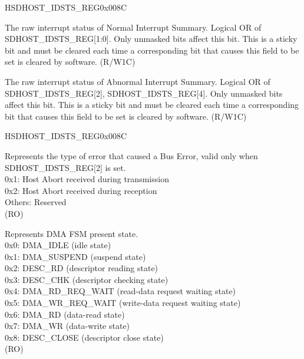 \begin{register}{H}{SDHOST\_IDSTS\_REG}{0x008C}
\begin{regdesc}
\begin{reglist}
\label{fielddesc:SDHOSTIDSTSNIS}\item [SDHOST\_IDSTS\_NIS] The raw interrupt status of Normal Interrupt Summary. Logical OR of SDHOST\_IDSTS\_REG[1:0]. Only unmasked bits affect this bit. This is a sticky bit and must be cleared each time a corresponding bit that causes this field to be set is cleared by software. (R/W1C)
\label{fielddesc:SDHOSTIDSTSAIS}\item [SDHOST\_IDSTS\_AIS] The raw interrupt status of Abnormal Interrupt Summary. Logical OR of SDHOST\_IDSTS\_REG[2], SDHOST\_IDSTS\_REG[4]. Only unmasked bits affect this bit. This is a sticky bit and must be cleared each time a corresponding bit that causes this field to be set is cleared by software. (R/W1C)
\item [Continued on the next page...]
\end{reglist}\end{regdesc}
\end{register}

\addtocounter{Regfloat}{-1}
\begin{register}{H}{SDHOST\_IDSTS\_REG}{0x008C}
\begin{regdesc}\begin{reglist}
\item [Continued from the previous page...]
\label{fielddesc:SDHOSTIDSTSFBECODE}\item [SDHOST\_IDSTS\_FBE\_CODE] Represents the type of error that caused a Bus Error, valid only when SDHOST\_IDSTS\_REG[2] is set.\\
0x1: Host Abort received during transmission\\
0x2: Host Abort received during reception\\
Others: Reserved\\ (RO)
\label{fielddesc:SDHOSTIDSTSFSM}\item [SDHOST\_IDSTS\_FSM] Represents DMA FSM present state.\\
0x0: DMA\_IDLE (idle state)\\
0x1: DMA\_SUSPEND (suspend state)\\
0x2: DESC\_RD (descriptor reading state)\\
0x3: DESC\_CHK (descriptor checking state)\\
0x4: DMA\_RD\_REQ\_WAIT (read-data request waiting state)\\
0x5: DMA\_WR\_REQ\_WAIT (write-data request waiting state)\\
0x6: DMA\_RD (data-read state)\\
0x7: DMA\_WR (data-write state)\\
0x8: DESC\_CLOSE (descriptor close state)\\ (RO)
\end{reglist}\end{regdesc}
\end{register}



